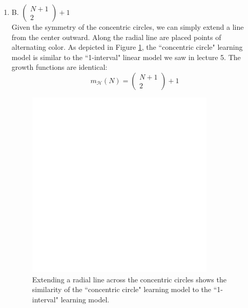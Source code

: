 \documentclass[11pt]{article}
\theoremstyle{definition}
\begin{document}
\begin{enumerate}
\newpage
\item B. \(\left( \begin{array}{c}N+1\\2\end{array}\right)+1\)\\
Given the symmetry of the concentric circles, we can simply extend a line from the center outward. Along the radial line are placed points of alternating color. As depicted in Figure \ref{conccircle}, the ``concentric circle" learning model is similar to the ``1-interval" linear model we saw in lecture 5. The growth functions are identical: \[m_\mathcal{H}(N)=\left( \begin{array}{c}N+1\\2 \end{array}\right)+1\]
	\begin{figure}[ht!]
	\centering
	\includegraphics[width=90mm]{hw03q10.pdf}
	\caption{Extending a radial line across the concentric circles shows the similarity of the ``concentric circle" learning model to the ``1-interval" learning model.}
	\label{conccircle}
	\end{figure}
\end{enumerate}

\label{LastPage}
\end{document}
